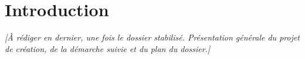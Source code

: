 \section*{Introduction}

\textit{[À rédiger en dernier, une fois le dossier stabilisé. Présentation générale
du projet de création, de la démarche suivie et du plan du dossier.]}
